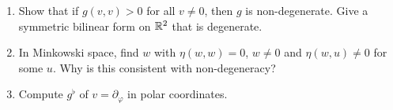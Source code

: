 \begin{exercises}
\begin{enumerate}[nosep]
\item Show that if $g(v,v)>0$ for all $v\neq0$, then $g$ is non-degenerate. Give a symmetric bilinear form on $\mathbb{R}^2$ that is degenerate.
\item In Minkowski space, find $w$ with $\eta(w,w)=0$, $w\ne0$ and $\eta(w,u)\neq0$ for some $u$. Why is this consistent with non-degeneracy?
\item Compute $g^\flat$ of $v=\partial_\varphi$ in polar coordinates.
\end{enumerate}
\end{exercises}
